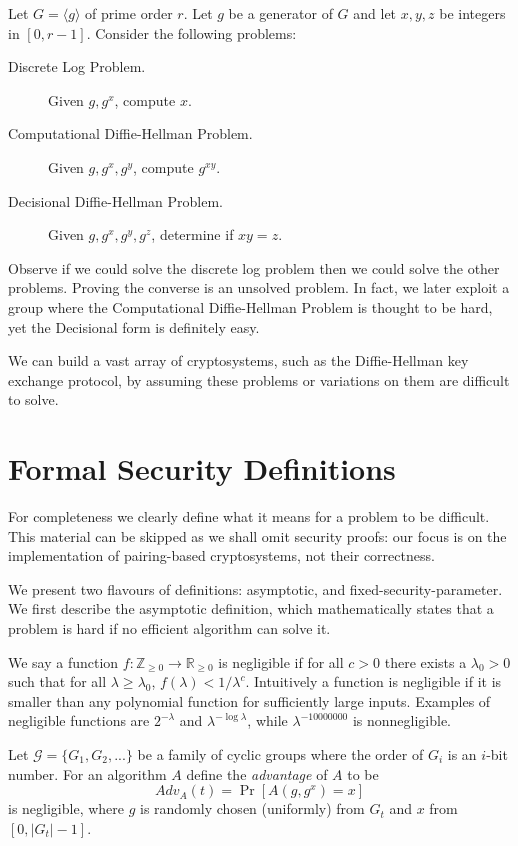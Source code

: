 Let $G = \langle g \rangle$ of prime order $r$. Let $g$ be a generator of $G$
and let $x, y, z$ be integers in $[0, r-1]$. Consider the following problems:

\begin{description}
\item [Discrete Log Problem.]
Given $g, g^x$, compute $x$.
\item [Computational Diffie-Hellman Problem.]
Given $g, g^x, g^y$, compute $g^{x y}$.
\item [Decisional Diffie-Hellman Problem.]
Given $g, g^x, g^y, g^z$, determine if $x y = z$.
\end{description}

Observe if we could solve the discrete log problem then we could solve
the other problems. Proving the converse is an unsolved problem. In fact,
we later exploit a group where the Computational Diffie-Hellman Problem is
thought to be hard, yet the Decisional form is definitely easy.

We can build a vast array of cryptosystems, such as the Diffie-Hellman key
exchange protocol, by assuming these problems or variations on them are
difficult to solve.

\section{Formal Security Definitions}

For completeness we clearly define what it means for a problem to be
difficult. This material can be skipped as we shall omit security proofs: our
focus is on the implementation of pairing-based cryptosystems, not their
correctness.

We present two flavours of definitions: asymptotic, and
fixed-security-parameter. We first describe the asymptotic definition,
which mathematically states that a problem is hard if no efficient algorithm
can solve it.

We say a function $f:\mathbb{Z}_{\ge 0} \rightarrow \mathbb{R}_{\ge 0}$
is negligible if for all $c > 0$ there exists a $\lambda_0 > 0$ such that
for all $\lambda \ge \lambda_0$, $f(\lambda) < 1 / \lambda^c$.
Intuitively a function is negligible if it is smaller than any polynomial
function for sufficiently large inputs. Examples of negligible functions
are $2^{-\lambda}$ and $\lambda^{-\log\lambda}$, while $\lambda^{-10000000}$
is nonnegligible.

Let $\mathcal G = \{G_1, G_2, ... \}$ be a family of cyclic groups
where the order of $G_i$ is an $i$-bit number.
For an algorithm $A$
define the \emph{advantage} of $A$ to be
\[
Adv_A(t) = \Pr [ A(g, g^x) = x ]
\]
is negligible,
where $g$ is randomly chosen (uniformly) from $G_t$ and $x$ from
$[0, |G_t|-1]$.

